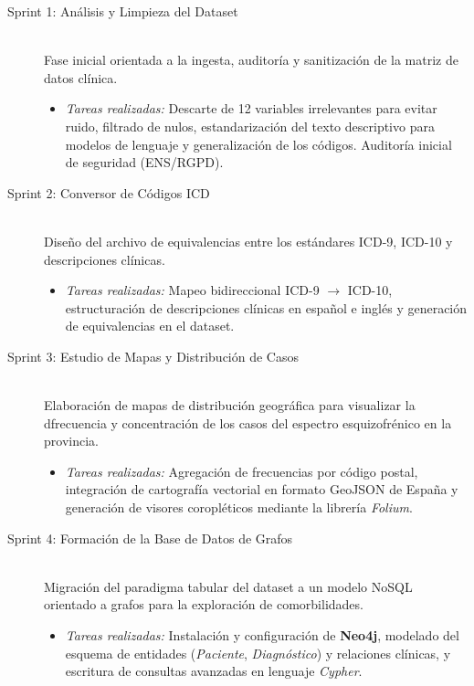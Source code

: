 \documentclass[12pt,a4paper,onecolumn,oneside]{report}
\begin{document}
\begin{description}
    \item[Sprint 1: Análisis y Limpieza del Dataset] \hfill \\
    Fase inicial orientada a la ingesta, auditoría y sanitización de la matriz de datos clínica.
    \begin{itemize}
        \item \textit{Tareas realizadas:} Descarte de 12 variables irrelevantes para evitar ruido, filtrado de nulos, estandarización del texto descriptivo para modelos de lenguaje y generalización de los códigos. Auditoría inicial de seguridad (ENS/RGPD).
    \end{itemize}

    \item[Sprint 2: Conversor de Códigos ICD] \hfill \\
    Diseño del archivo de equivalencias entre los estándares ICD-9, ICD-10 y descripciones clínicas.
    \begin{itemize}
        \item \textit{Tareas realizadas:} Mapeo bidireccional ICD-9 $\rightarrow$ ICD-10, estructuración de descripciones clínicas en español e inglés y generación de equivalencias en el dataset.
    \end{itemize}

    \item[Sprint 3: Estudio de Mapas y Distribución de Casos] \hfill \\
    Elaboración de mapas de distribución geográfica para visualizar la dfrecuencia y concentración de los casos del espectro esquizofrénico en la provincia.
    \begin{itemize}
        \item \textit{Tareas realizadas:} Agregación de frecuencias por código postal, integración de cartografía vectorial en formato GeoJSON de España y generación de visores coropléticos mediante la librería \textit{Folium}.
    \end{itemize}
    
    \item[Sprint 4: Formación de la Base de Datos de Grafos] \hfill \\
    Migración del paradigma tabular del dataset a un modelo NoSQL orientado a grafos para la exploración de comorbilidades.
    \begin{itemize}
        \item \textit{Tareas realizadas:} Instalación y configuración de \textbf{Neo4j}, modelado del esquema de entidades (\textit{Paciente}, \textit{Diagnóstico}) y relaciones clínicas, y escritura de consultas avanzadas en lenguaje \textit{Cypher}.
    \end{itemize}
    

\end{description}
\end{document}
